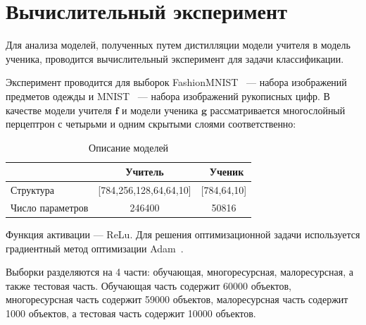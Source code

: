 \newpage

\section{Вычислительный эксперимент}

Для анализа моделей, полученных путем дистилляции модели учителя в модель ученика, проводится вычислительный эксперимент для задачи классификации.

Эксперимент проводится для выборок FashionMNIST~\cite{FMNIST} --- набора изображений предметов одежды и MNIST~\cite{MNIST} --- набора изображений рукописных цифр. В качестве модели учителя $\textbf{f}$ и модели ученика $\textbf{g}$ рассматривается многослойный перцептрон с четырьми и одним скрытыми слоями соответственно:

\begin{table}[h!t]
\begin{center}
\caption{Описание моделей}
\label{table_1}
\begin{tabular}{|c|c|c|}
\hline
	 & Учитель &\ Ученик\\
	\hline
	\multicolumn{1}{|l|}{Структура}
	& [784,256,128,64,64,10]& [784,64,10]\\
	\hline
	\multicolumn{1}{|l|}{Число параметров}
	& 246400 & 50816\\
\hline

\end{tabular}
\end{center}
\end{table}

Функция активации --- ReLu. Для решения оптимизационной задачи используется градиентный метод оптимизации Adam~\cite{Adam}.

Выборки разделяются на 4 части: обучающая, многоресурсная, малоресурсная, а также тестовая часть. Обучающая часть содержит 60000 объектов, многоресурсная часть содержит 59000 объектов, малоресурсная часть содержит 1000 объектов, а тестовая часть содержит 10000 объектов.

